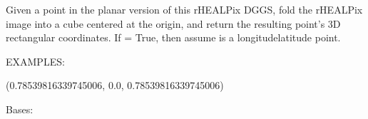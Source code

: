 \documentclass[a4paper,12ptopenany,oneside,english]{sphinxmanual}
\begin{document}
\begin{fulllineitems}
\begin{fulllineitems}
\begin{description}
\end{description}

\end{fulllineitems}


\begin{fulllineitems}
\label{\detokenize{dggs:rhealpixdggs.dggs.RHEALPixDGGS.xyz_cube}}
\pysigstartsignatures
{}
\pysigstopsignatures
\sphinxAtStartPar
Given a point  in the planar version of this rHEALPix DGGS,
fold the rHEALPix image into a cube centered at the origin,
and return the resulting point’s 3D rectangular coordinates.
If  = True, then assume  is a longitude\sphinxhyphen{}latitude
point.

\sphinxAtStartPar
EXAMPLES:

\begin{sphinxVerbatim}[commandchars=\\\{\}]
  
  
\end{sphinxVerbatim}
\begin{description}
\sphinxAtStartPar
(0.78539816339745006, 0.0, \sphinxhyphen{}0.78539816339745006)

\end{description}

\end{fulllineitems}


\end{fulllineitems}


\begin{fulllineitems}
\label{\detokenize{dggs:rhealpixdggs.dggs.RhealPolygon}}
\pysigstartsignatures
{}
\pysigstopsignatures
\sphinxAtStartPar
Bases: 

\end{fulllineitems}
\end{document}
